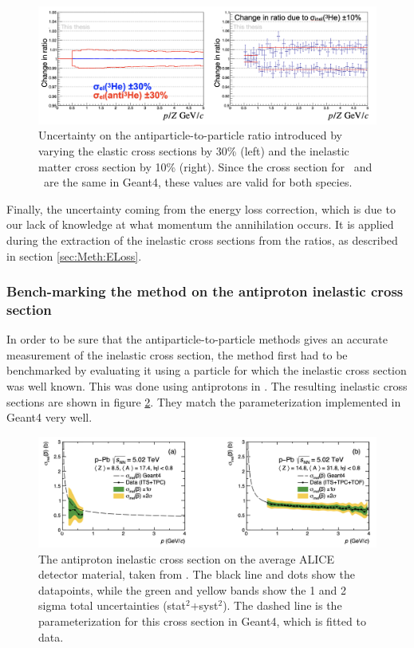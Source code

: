 \begin{figure}
    \centering
    \includegraphics[width=\textwidth]{figures/systematic_uncertainty_other_xs.png}
    \caption{Uncertainty on the antiparticle-to-particle ratio introduced by varying the elastic cross sections by 30\% (left) and the inelastic matter cross section by 10\% (right). Since the cross section for \atrit\ and \ahe\ are the same in Geant4, these values are valid for both species.}
    \label{fig:syst_uncertainties_elastic_xs}
\end{figure}

Finally, the uncertainty coming from the energy loss correction, which is due to our lack of knowledge at what momentum the annihilation occurs. It is applied during the extraction of the inelastic cross sections from the ratios, as described in section \ref{sec:Meth:ELoss}.   


\subsubsection{Bench-marking the method on the antiproton inelastic cross section}
In order to be sure that the antiparticle-to-particle methods gives an accurate measurement of the inelastic cross section, the method first had to be benchmarked by evaluating it using a particle for which the inelastic cross section was well known. This was done using antiprotons in \cite{antideuteronXS}. The resulting inelastic cross sections are shown in figure \ref{fig:pbar_sigma_inel}. They match the parameterization implemented in Geant4 very well.\\

\begin{figure}
    \centering
    \includegraphics[width=\textwidth]{figures/antiproton_inelastic_xs.png}
    \caption{The antiproton inelastic cross section on the average ALICE detector material, taken from \cite{antideuteronXS}. The black line and dots show the datapoints, while the green and yellow bands show the 1 and 2 sigma total uncertainties (stat$^2$+syst$^2$). The dashed line is the parameterization for this cross section in Geant4, which is fitted to data.}
    \label{fig:pbar_sigma_inel}
\end{figure}

